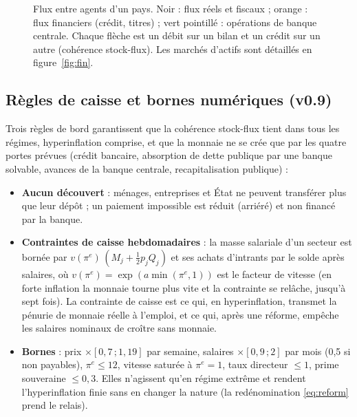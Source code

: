 \documentclass[11pt,a4paper]{article}
\begin{document}
\begin{figure}[htbp]
{}
\caption{Flux entre agents d'un pays. Noir : flux réels et fiscaux ; orange : flux financiers (crédit, titres) ; vert pointillé : opérations de banque centrale. Chaque flèche est un débit sur un bilan et un crédit sur un autre (cohérence stock-flux). Les marchés d'actifs sont détaillés en figure~\ref{fig:fin}.}
\label{fig:flux}
\end{figure}

\subsection{Règles de caisse et bornes numériques (v0.9)}
\label{sec:sfc}
Trois règles de bord garantissent que la cohérence stock-flux tient dans tous les régimes, hyperinflation comprise, et que la monnaie ne se crée que par les quatre portes prévues (crédit bancaire, absorption de dette publique par une banque solvable, avances de la banque centrale, recapitalisation publique) :
\begin{itemize}
\item \textbf{Aucun découvert} : ménages, entreprises et État ne peuvent transférer plus que leur dépôt ; un paiement impossible est réduit (arriéré) et non financé par la banque.
\item \textbf{Contraintes de caisse hebdomadaires} : la masse salariale d'un secteur est bornée par $v(\pi^e)\,(M_j+\tfrac12 p_jQ_j)$ et ses achats d'intrants par le solde après salaires, où $v(\pi^e)=\exp(a\min(\pi^e,1))$ est le facteur de vitesse (en forte inflation la monnaie tourne plus vite et la contrainte se relâche, jusqu'à sept fois). La contrainte de caisse est ce qui, en hyperinflation, transmet la pénurie de monnaie réelle à l'emploi, et ce qui, après une réforme, empêche les salaires nominaux de croître sans monnaie.
\item \textbf{Bornes} : prix $\times[0{,}7\,;1{,}19]$ par semaine, salaires $\times[0{,}9\,;2]$ par mois (0,5 si non payables), $\pi^e\le12$, vitesse saturée à $\pi^e=1$, taux directeur $\le1$, prime souveraine $\le0{,}3$. Elles n'agissent qu'en régime extrême et rendent l'hyperinflation finie sans en changer la nature (la redénomination \eqref{eq:reform} prend le relais).
\end{itemize}
\end{document}
